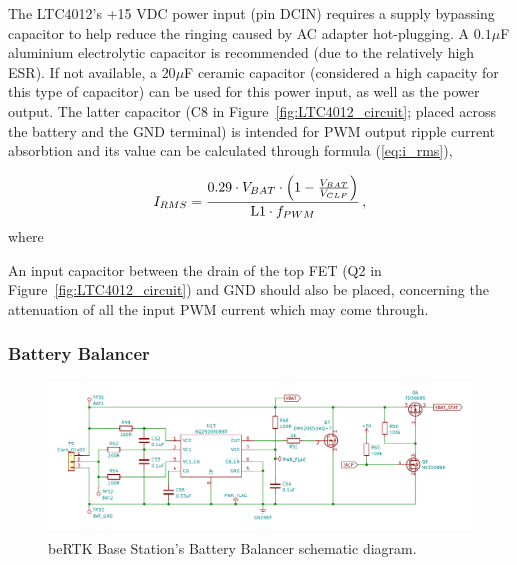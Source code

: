 The LTC4012's +15 VDC power input (pin DCIN) requires a supply bypassing capacitor to help reduce the \gls{ringing} caused by AC adapter \gls{hot-plugging}. A $0.1 \mu$F aluminium electrolytic capacitor is recommended (due to the relatively high \gls{ESR}). If not available, a $20 \mu$F ceramic capacitor (considered a high capacity for this type of capacitor) can be used for this power input, as well as the power output. The latter capacitor (C8 in Figure~\ref{fig:LTC4012_circuit}; placed across the battery and the GND terminal) is intended for PWM output ripple current absorbtion and its value can be calculated through formula (\ref{eq:i_rms}),

\begin{equation}\label{eq:i_rms}
    I_{RMS}=\frac{0.29 \cdot V_{BAT} \cdot \left(1-\frac{V_{BAT}}{V_{CLP}}\right)}{\textrm{L1} \cdot f_{PWM}}\,,\medskip
\end{equation}
where		%

An input capacitor between the drain of the top FET (Q2 in Figure~\ref{fig:LTC4012_circuit}) and GND should also be placed, concerning the attenuation of all the input PWM current which may come through.


\subsubsection{Battery Balancer}\label{sec:3212_BQ29209}

\begin{figure}[h]
	\centering
	\includegraphics[width=1.0\textwidth]{Chapters/Figures/chapter3/Battery_Balancer.pdf}
	\caption{beRTK\textsuperscript{\textregistered} Base Station's Battery Balancer schematic diagram.}
	\label{fig:BQ29209_circuit}
\end{figure}

